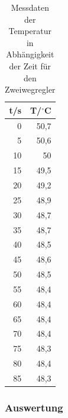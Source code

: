 \documentclass[12pt,a4paper]{article}
\begin{document}
\begin{table}[htbp]
\begin{center}
\begin{tabular}{|r|r|}
\hline
t/s & T/$^\circ$C \\ \hline
0 & 50,7 \\ \hline
5 & 50,6 \\ \hline
10 & 50 \\ \hline
15 & 49,5 \\ \hline
20 & 49,2 \\ \hline
25 & 48,9 \\ \hline
30 & 48,7 \\ \hline
35 & 48,7 \\ \hline
40 & 48,5 \\ \hline
45 & 48,6 \\ \hline
50 & 48,5 \\ \hline
55 & 48,4 \\ \hline
60 & 48,4 \\ \hline
65 & 48,4 \\ \hline
70 & 48,4 \\ \hline
75 & 48,3 \\ \hline
80 & 48,4 \\ \hline
85 & 48,3 \\ \hline
\end{tabular}
\end{center}
\caption{Messdaten der Temperatur in Abhängigkeit der Zeit für den Zweiwegregler}
\label{tab:2_1}
\end{table}


\subsubsection*{Auswertung}
\end{document}
